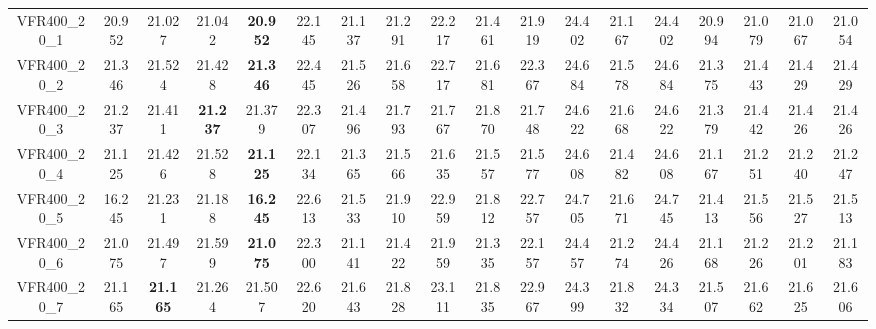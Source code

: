 \begin{tabular}{cc|ccc|ccccccccccccc}
VFR400\_20\_1      & 20.952           & 21.027           & 21.042           & {\bf 20.952}     & 22.145           & 21.137           & 21.291           & 22.217           & 21.461           & 21.919           & 24.402           & 21.167           & 24.402           & 20.994           & 21.079           & 21.067           & 21.054          \\ 
VFR400\_20\_2      & 21.346           & 21.524           & 21.428           & {\bf 21.346}     & 22.445           & 21.526           & 21.658           & 22.717           & 21.681           & 22.367           & 24.684           & 21.578           & 24.684           & 21.375           & 21.443           & 21.429           & 21.429          \\ 
VFR400\_20\_3      & 21.237           & 21.411           & {\bf 21.237}     & 21.379           & 22.307           & 21.496           & 21.793           & 21.767           & 21.870           & 21.748           & 24.622           & 21.668           & 24.622           & 21.379           & 21.442           & 21.426           & 21.426          \\ 
VFR400\_20\_4      & 21.125           & 21.426           & 21.528           & {\bf 21.125}     & 22.134           & 21.365           & 21.566           & 21.635           & 21.557           & 21.577           & 24.608           & 21.482           & 24.608           & 21.167           & 21.251           & 21.240           & 21.247          \\ 
VFR400\_20\_5      & 16.245           & 21.231           & 21.188           & {\bf 16.245}     & 22.613           & 21.533           & 21.910           & 22.959           & 21.812           & 22.757           & 24.705           & 21.671           & 24.745           & 21.413           & 21.556           & 21.527           & 21.513          \\ 
VFR400\_20\_6      & 21.075           & 21.497           & 21.599           & {\bf 21.075}     & 22.300           & 21.141           & 21.422           & 21.959           & 21.335           & 22.157           & 24.457           & 21.274           & 24.426           & 21.168           & 21.226           & 21.201           & 21.183          \\ 
VFR400\_20\_7      & 21.165           & {\bf 21.165}     & 21.264           & 21.507           & 22.620           & 21.643           & 21.828           & 23.111           & 21.835           & 22.967           & 24.399           & 21.832           & 24.334           & 21.507           & 21.662           & 21.625           & 21.606          \\ 

\end{tabular}
